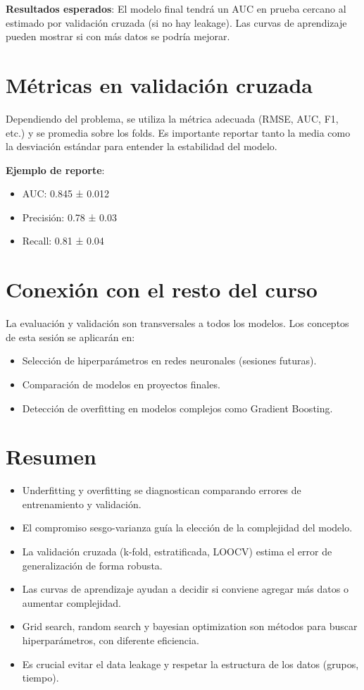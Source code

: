 \documentclass[12pt,a4paper,openany,oneside]{book}
\begin{document}
\textbf{Resultados esperados}: El modelo final tendrá un AUC en prueba cercano al estimado por validación cruzada (si no hay leakage). Las curvas de aprendizaje pueden mostrar si con más datos se podría mejorar.

\section{Métricas en validación cruzada}

Dependiendo del problema, se utiliza la métrica adecuada (RMSE, AUC, F1, etc.) y se promedia sobre los folds. Es importante reportar tanto la media como la desviación estándar para entender la estabilidad del modelo.

\textbf{Ejemplo de reporte}:
\begin{itemize}
    \item AUC: 0.845 ± 0.012
    \item Precisión: 0.78 ± 0.03
    \item Recall: 0.81 ± 0.04
\end{itemize}

\section{Conexión con el resto del curso}

La evaluación y validación son transversales a todos los modelos. Los conceptos de esta sesión se aplicarán en:
\begin{itemize}
    \item Selección de hiperparámetros en redes neuronales (sesiones futuras).
    \item Comparación de modelos en proyectos finales.
    \item Detección de overfitting en modelos complejos como Gradient Boosting.
\end{itemize}

\section{Resumen}
\begin{itemize}
    \item Underfitting y overfitting se diagnostican comparando errores de entrenamiento y validación.
    \item El compromiso sesgo-varianza guía la elección de la complejidad del modelo.
    \item La validación cruzada (k-fold, estratificada, LOOCV) estima el error de generalización de forma robusta.
    \item Las curvas de aprendizaje ayudan a decidir si conviene agregar más datos o aumentar complejidad.
    \item Grid search, random search y bayesian optimization son métodos para buscar hiperparámetros, con diferente eficiencia.
    \item Es crucial evitar el data leakage y respetar la estructura de los datos (grupos, tiempo).
\end{itemize}
\end{document}
